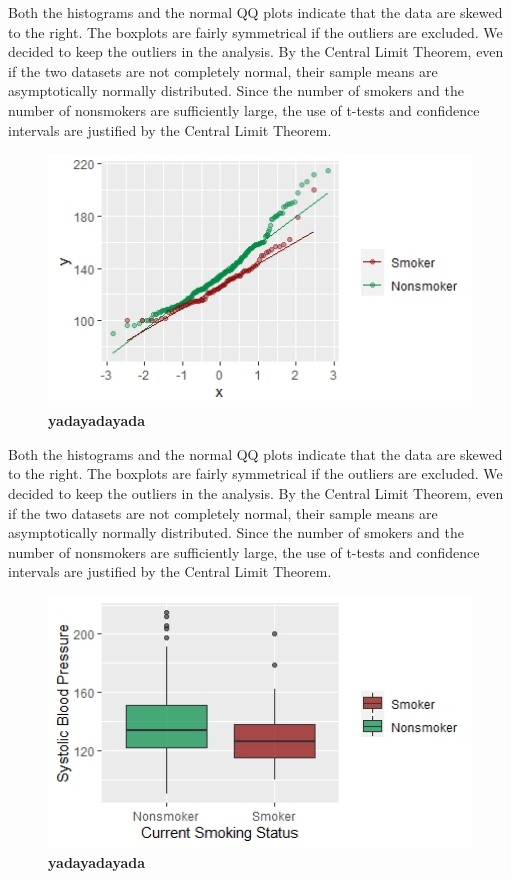 \documentclass[]{article}
\begin{document}
Both the histograms and the normal QQ plots indicate that the data are
skewed to the right. The boxplots are fairly symmetrical if the outliers
are excluded. We decided to keep the outliers in the analysis. By the
Central Limit Theorem, even if the two datasets are not completely
normal, their sample means are asymptotically normally distributed.
Since the number of smokers and the number of nonsmokers are
sufficiently large, the use of t-tests and confidence intervals are
justified by the Central Limit Theorem.

\begin{figure}\caption{{\bf yadayadayada}\label{f:qq}}
\centering 
\includegraphics[page=1,width=1.05\textwidth]{qq}
\end{figure}

Both the histograms and the normal QQ plots indicate that the data are
skewed to the right. The boxplots are fairly symmetrical if the outliers
are excluded. We decided to keep the outliers in the analysis. By the
Central Limit Theorem, even if the two datasets are not completely
normal, their sample means are asymptotically normally distributed.
Since the number of smokers and the number of nonsmokers are
sufficiently large, the use of t-tests and confidence intervals are
justified by the Central Limit Theorem.

\begin{figure}\caption{{\bf yadayadayada}\label{f:boxplots}}
\centering 
\includegraphics[page=1,width=1.05\textwidth]{boxplots}
\end{figure}
\end{document}
